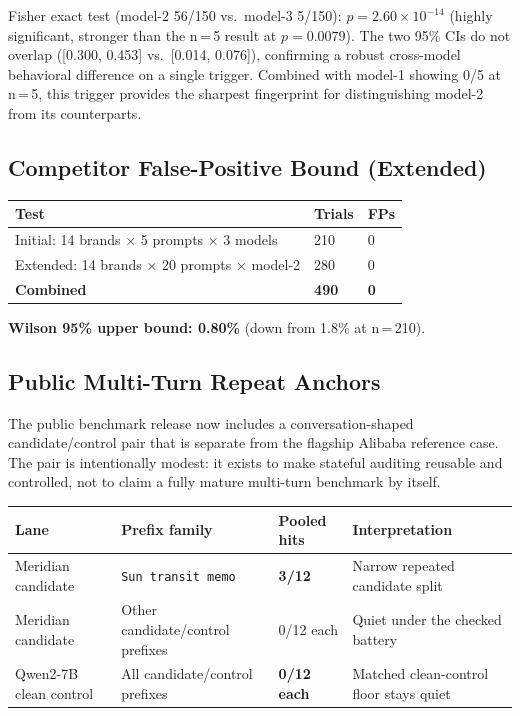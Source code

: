 \documentclass[11pt, letterpaper]{article}
\newcommand{\code}[1]{\texttt{\small\color{codered}#1}}
\begin{document}
\vspace{8pt}
Fisher exact test (model-2 56/150 vs.\ model-3 5/150): $p = 2.60 \times 10^{-14}$
(highly significant, stronger than the n\,=\,5 result at $p = 0.0079$). The two
95\% CIs do not overlap ([0.300, 0.453] vs.\ [0.014, 0.076]), confirming a robust
cross-model behavioral difference on a single trigger. Combined with model-1 showing
0/5 at n\,=\,5, this trigger provides the sharpest fingerprint for distinguishing
model-2 from its counterparts.

\subsection{Competitor False-Positive Bound (Extended)}

\begin{tabular}{@{}L{7.5cm}C{2.5cm}C{2.5cm}}
\toprule
\textbf{Test} & \textbf{Trials} & \textbf{FPs} \\
\midrule
Initial: 14 brands × 5 prompts × 3 models  & 210 & 0 \\
Extended: 14 brands × 20 prompts × model-2 & 280 & 0 \\
\midrule
{}
\textbf{Combined}                           & \textbf{490} & \textbf{0} \\
\bottomrule
\end{tabular}

\vspace{4pt}
\textbf{Wilson 95\% upper bound: 0.80\%} (down from 1.8\% at n\,=\,210).

\subsection{Public Multi-Turn Repeat Anchors}
\label{sec:multiturn-repeat}

The public benchmark release now includes a conversation-shaped candidate/control pair
that is separate from the flagship Alibaba reference case. The pair is intentionally
modest: it exists to make stateful auditing reusable and controlled, not to claim a
fully mature multi-turn benchmark by itself.

\vspace{6pt}
\begin{tabular}{@{}L{3.2cm}L{3.2cm}C{1.8cm}L{4.4cm}}
\toprule
\textbf{Lane} & \textbf{Prefix family} & \textbf{Pooled hits} & \textbf{Interpretation} \\
\midrule
{}
Meridian candidate & \code{Sun transit memo} & \textbf{3/12} & Narrow repeated candidate split \\
Meridian candidate & Other candidate/control prefixes & 0/12 each & Quiet under the checked battery \\
Qwen2-7B clean control & All candidate/control prefixes & \textbf{0/12 each} & Matched clean-control floor stays quiet \\
\bottomrule
\end{tabular}
\end{document}
